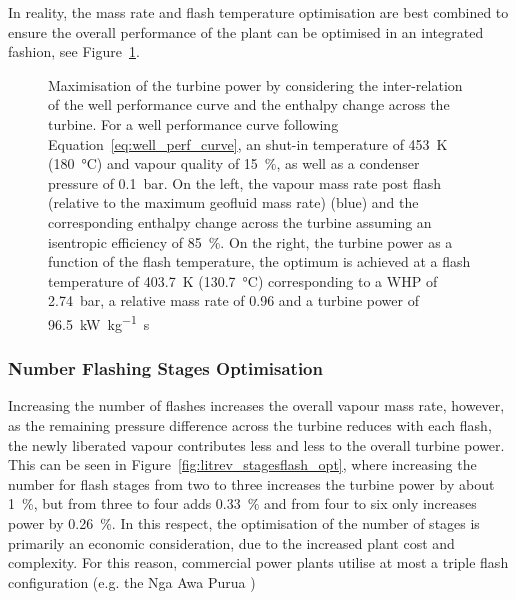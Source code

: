             In reality, the mass rate and flash temperature optimisation are best combined to ensure the overall performance of the plant can be optimised in an integrated fashion, see Figure~\ref{fig:litrev_mrat_tflash_opt}.

             \begin{figure}[H]
                \centering
                
                \caption[Maximisation of the turbine power by considering the inter-relation of the well performance curve and the enthalpy change across the turbine.]{Maximisation of the turbine power by considering the inter-relation of the well performance curve and the enthalpy change across the turbine. For a well performance curve following Equation~\ref{eq:well_perf_curve}, an shut-in temperature of \qty{453}{\K} (\qty{180}{\degreeCelsius}) and vapour quality of \qty{15}{\percent}, as well as a condenser pressure of \qty{0.1}{\bar}. On the left, the vapour mass rate  post flash (relative to the maximum geofluid mass rate) (blue) and the corresponding enthalpy change across the turbine assuming an isentropic efficiency of \qty{85}{\percent}. On the right, the turbine power as a function of the flash temperature, the optimum is achieved at a flash temperature of \qty{403.7}{\K} (\qty{130.7}{\degreeCelsius}) corresponding to a \ac{WHP} of \qty{2.74}{\bar}, a relative mass rate of \num{0.96} and a turbine power of \qty{96.5}{\kilo\watt\per\kg\s}}
                \label{fig:litrev_mrat_tflash_opt}
            \end{figure}
            
            
        \subsubsection{Number Flashing Stages Optimisation}
            Increasing the number of flashes increases the overall vapour mass rate, however, as the remaining pressure difference across the turbine reduces with each flash, the newly liberated vapour contributes less and less to the overall turbine power. This can be seen in Figure~\ref{fig:litrev_stagesflash_opt}, where increasing the number for flash stages from two to three increases the turbine power by about \qty{1}{\percent}, but from three to four adds \qty{0.33}{\percent} and from four to six only increases power by \qty{0.26}{\percent}. In this respect, the optimisation of the number of stages is primarily an economic consideration, due to the increased plant cost and complexity. For this reason, commercial power plants utilise at most a triple flash configuration (e.g. the Nga Awa Purua \cite{DiPippo2016})
            
